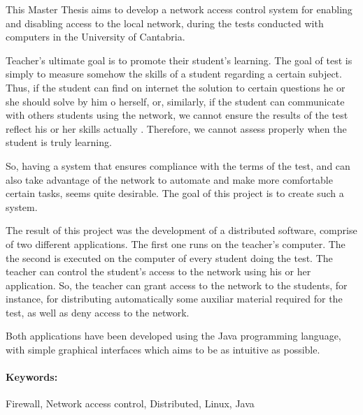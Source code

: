 
This Master Thesis aims to develop a network access control system for
enabling and disabling access to the local network, during the tests
conducted with computers in the University of Cantabria.
\newline

Teacher's ultimate goal is to promote their student's learning. The goal
of test is simply to measure somehow the skills of a student regarding a
certain subject. Thus, if the student can find on internet the solution
to certain questions he or she should solve by him o herself, or,
similarly, if the student can communicate with others students using the
network, we cannot ensure the results of the test reflect his or her
skills actually . Therefore, we cannot assess properly when the student
is truly learning.
\newline

So, having a system that ensures compliance with the terms of the test,
and can also take advantage of the network to automate and make more
comfortable certain tasks, seems quite desirable. The goal of this
project is to create such a system.
\newline


The result of this project was the development of a distributed
software, comprise of two different applications. The first one runs on
the teacher’s computer. The the second is executed on the computer of
every student doing the test. The teacher can control the student’s
access to the network using his or her application. So, the teacher can
grant access to the network to the students, for instance, for
distributing automatically some auxiliar material required for the test,
as well as deny access to the network.
\newline

Both applications have been developed using the Java programming
language, with simple graphical interfaces which aims to be as intuitive
as possible.
\newline

\paragraph{Keywords:}
 Firewall, Network access control, Distributed, Linux, Java


